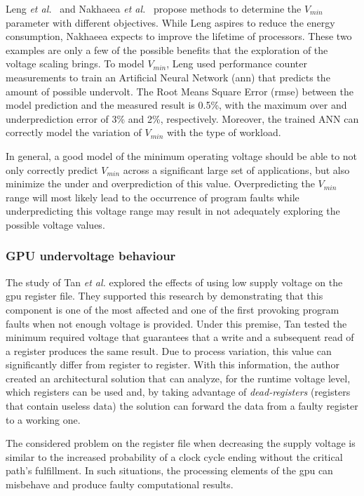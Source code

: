 Leng \textit{et al.}~\cite{leng_safe_2015} and Nakhaeea \textit{et al.}~\cite{nakhaee_lifetime_2018} propose methods to determine the $V_{min}$ parameter with different objectives. While Leng aspires to reduce the energy consumption, Nakhaeea expects to improve the lifetime of processors. These two examples are only a few of the possible benefits that the exploration of the voltage scaling brings. To model $V_{min}$, Leng used performance counter measurements to train an Artificial Neural Network (\acrshort{ann}) that predicts the amount of possible undervolt. The Root Means Square Error (\acrshort{rmse}) between the model prediction and the measured result is 0.5\%, with the maximum over and underprediction error of 3\% and 2\%, respectively. Moreover, the trained ANN can correctly model the variation of $V_{min}$ with the type of workload.

In general, a good model of the minimum operating voltage should be able to not only correctly predict  $V_{min}$ across a significant large set of applications, but also minimize the under and overprediction of this value. Overpredicting the  $V_{min}$ range will most likely lead to the occurrence of program faults while underpredicting this voltage range may result in not adequately exploring the possible voltage values.

\subsubsection{GPU undervoltage behaviour}

The study of Tan \textit{et al.} \cite{tan_combating_2016} explored the effects of using low supply voltage on the \acrshort{gpu} register file. They supported this research by demonstrating that this component is one of the most affected and one of the first provoking program faults when not enough voltage is provided. Under this premise, Tan tested the minimum required voltage that guarantees that a write and a subsequent read of a register produces the same result. Due to process variation, this value can significantly differ from register to register. With this information, the author created an architectural solution that can analyze, for the runtime voltage level, which registers can be used and, by taking advantage of \textit{dead-registers} (registers that contain useless data) the solution can forward the data from a faulty register to a working one.

The considered problem on the register file when decreasing the supply voltage is similar to the increased probability of a clock cycle ending without the critical path's fulfillment. In such situations, the processing elements of the \acrshort{gpu} can misbehave and produce faulty computational results.


